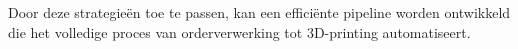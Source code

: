 Door deze strategieën toe te passen, kan een efficiënte pipeline worden ontwikkeld die het volledige proces van orderverwerking tot 3D-printing automatiseert.











